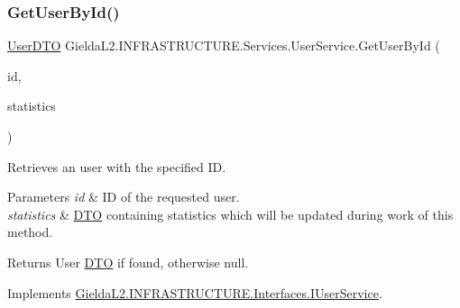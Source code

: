 \subsubsection{\texorpdfstring{GetUserById()}{GetUserById()}}
{\footnotesize\ttfamily \mbox{\hyperlink{class_gielda_l2_1_1_i_n_f_r_a_s_t_r_u_c_t_u_r_e_1_1_d_t_o_1_1_user_d_t_o}{User\+D\+TO}} Gielda\+L2.\+I\+N\+F\+R\+A\+S\+T\+R\+U\+C\+T\+U\+R\+E.\+Services.\+User\+Service.\+Get\+User\+By\+Id (\begin{DoxyParamCaption}\item[{int}]{id,  }\item[{\mbox{\hyperlink{class_gielda_l2_1_1_i_n_f_r_a_s_t_r_u_c_t_u_r_e_1_1_d_t_o_1_1_statistics_d_t_o}{Statistics\+D\+TO}}}]{statistics }\end{DoxyParamCaption})}



Retrieves an user with the specified ID. 


\begin{DoxyParams}{Parameters}
{\em id} & ID of the requested user.\\
\hline
{\em statistics} & \mbox{\hyperlink{namespace_gielda_l2_1_1_i_n_f_r_a_s_t_r_u_c_t_u_r_e_1_1_d_t_o}{D\+TO}} containing statistics which will be updated during work of this method.\\
\hline
\end{DoxyParams}
\begin{DoxyReturn}{Returns}
User \mbox{\hyperlink{namespace_gielda_l2_1_1_i_n_f_r_a_s_t_r_u_c_t_u_r_e_1_1_d_t_o}{D\+TO}} if found, otherwise null.
\end{DoxyReturn}


Implements \mbox{\hyperlink{interface_gielda_l2_1_1_i_n_f_r_a_s_t_r_u_c_t_u_r_e_1_1_interfaces_1_1_i_user_service_a2fd0719208e4bd393517dece3b039564}{Gielda\+L2.\+I\+N\+F\+R\+A\+S\+T\+R\+U\+C\+T\+U\+R\+E.\+Interfaces.\+I\+User\+Service}}.

\mbox{\label{class_gielda_l2_1_1_i_n_f_r_a_s_t_r_u_c_t_u_r_e_1_1_services_1_1_user_service_aea2901aafb86692c9aa8efa24b8801ee}} 
